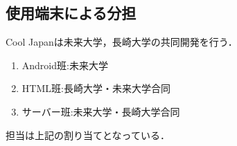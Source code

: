 \subsection{使用端末による分担}
\par
Cool Japanは未来大学，長崎大学の共同開発を行う．
\begin{enumerate}
\item Android班:未来大学
\item HTML班:長崎大学・未来大学合同
\item サーバー班:未来大学・長崎大学合同
\end{enumerate}
\par
担当は上記の割り当てとなっている．
